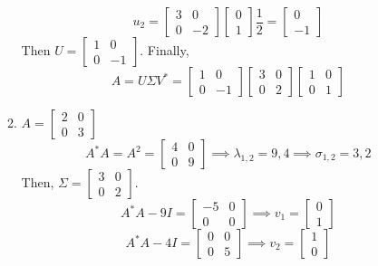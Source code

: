 \documentclass[12pt]{article}
\numberwithin{equation}{section}
\begin{document}
\begin{enumerate}
\begin{enumerate}
    $$u_2=\left[\begin{array}{cc}3&0\\0&-2\end{array}\right]\left[\begin{array}{c}0\\1\end{array}\right]\frac{1}{2}=\left[\begin{array}{c}0\\-1\end{array}\right]$$
    Then $U=\left[\begin{array}{cc}1&0\\0&-1\end{array}\right]$. Finally,
    $$A=U\Sigma V^*=\left[\begin{array}{cc}1&0\\0&-1\end{array}\right]\left[\begin{array}{cc}3&0\\0&2\end{array}\right]\left[\begin{array}{cc}1&0\\0&1\end{array}\right]$$
    \item $A=\left[\begin{array}{cc}2&0\\0&3\end{array}\right]$
    $$A^*A=A^2=\left[\begin{array}{cc}4&0\\0&9\end{array}\right]\implies \lambda_{1,2}=9,4\implies \sigma_{1,2}=3,2$$
    Then, $\Sigma=\left[\begin{array}{cc}3&0\\0&2\end{array}\right]$.
    $$A^*A-9I=\left[\begin{array}{cc}-5&0\\0&0\end{array}\right]\implies v_1=\left[\begin{array}{c}0\\1\end{array}\right]$$
    $$A^*A-4I=\left[\begin{array}{cc}0&0\\0&5\end{array}\right]\implies v_2=\left[\begin{array}{c}1\\0\end{array}\right]$$

\end{enumerate}
\end{enumerate}
\end{document}
